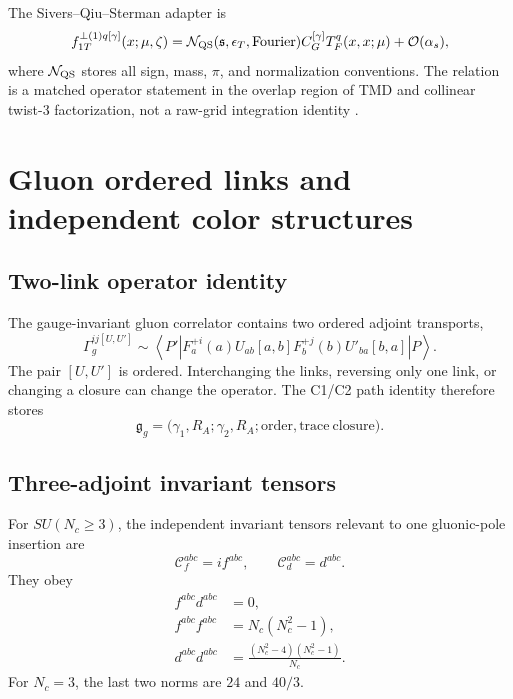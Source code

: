 \documentclass[11pt]{article}
\newcommand{\cO}{\mathcal O}
\newcommand{\cC}{\mathcal C}
\newcommand{\cN}{\mathcal N}
\begin{document}
The Sivers--Qiu--Sterman adapter is
\begin{equation}
 f_{1T}^{\perp(1)q[\gamma]}(x;\mu,\zeta)
 =\cN_{\rm QS}(\mathfrak s,\epsilon_T,\mathrm{Fourier})
 C_G^{[\gamma]}T_F^q(x,x;\mu)
 +\cO(\alpha_s),
\label{eq:sivers-qiu-sterman-adapter}
\end{equation}
where \(\cN_{\rm QS}\) stores all sign, mass, \(\pi\), and normalization
conventions.  The relation is a matched operator statement in the overlap
region of TMD and collinear twist-3 factorization, not a raw-grid integration
identity \cite{JiQiuVogelsangYuan2006,JiQiuVogelsangYuanSIDIS2006}.

\section{Gluon ordered links and independent color structures}
\label{sec:gluon-todd}

\subsection{Two-link operator identity}

The gauge-invariant gluon correlator contains two ordered adjoint transports,
\begin{equation}
 \Gamma^{ij[U,U']}_{g}
 \sim
 \left\langle P'\left|
 F^{+i}_a(a)
 U_{ab}[a,b]
 F^{+j}_b(b)
 U'_{ba}[b,a]
 \right|P\right\rangle.
\label{eq:gluon-two-link-operator}
\end{equation}
The pair \([U,U']\) is ordered.  Interchanging the links, reversing only one
link, or changing a closure can change the operator.  The C1/C2 path identity
therefore stores
\begin{equation}
 \mathfrak g_g
 =\bigl(\gamma_1,R_A;\gamma_2,R_A;
 \mathrm{order},\mathrm{trace\ closure}\bigr).
\label{eq:gluon-link-pair-identity}
\end{equation}

\subsection{Three-adjoint invariant tensors}

For \(SU(N_c\ge3)\), the independent invariant tensors relevant to one
gluonic-pole insertion are
\begin{equation}
 \cC_f^{abc}=if^{abc},
 \qquad
 \cC_d^{abc}=d^{abc}.
\label{eq:f-d-color-tensors}
\end{equation}
They obey
\begin{align}
 f^{abc}d^{abc}&=0,
\label{eq:fd-orthogonality}\\
 f^{abc}f^{abc}&=N_c(N_c^2-1),
\label{eq:ff-norm}\\
 d^{abc}d^{abc}&=\frac{(N_c^2-4)(N_c^2-1)}{N_c}.
\label{eq:dd-norm}
\end{align}
For \(N_c=3\), the last two norms are \(24\) and \(40/3\).
\end{document}
